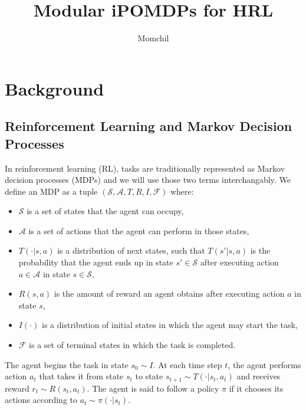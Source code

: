\documentclass[11pt]{article}
\title{Modular iPOMDPs for HRL}
\author{Momchil}
\begin{document}
\maketitle






\section{Background} 


\subsection{Reinforcement Learning and Markov Decision Processes}

In reinforcement learning (RL), tasks are traditionally represented as Markov decision processes (MDPs) \cite{Sutton1998} and we will use those two terms interchangably. We define an MDP as a tuple $(\mathcal{S}, \mathcal{A}, T, R, I, \mathcal{F})$ where:
\begin{itemize}
\item $\mathcal{S}$ is a set of states that the agent can occupy,
\item $\mathcal{A}$ is a set of actions that the agent can perform in those states,
\item $T(\cdot|s,a)$ is a distribution of next states, such that $T(s'|s,a)$ is the probability that the agent ends up in state $s' \in \mathcal{S}$ after executing action $a \in \mathcal{A}$ in state $s \in \mathcal{S}$,
\item $R(s,a)$ is the amount of reward an agent obtains after executing action $a$ in state $s$,
\item $I(\cdot)$ is a distribution of initial states in which the agent may start the task,
\item $\mathcal{F}$ is a set of terminal states in which the task is completed.
\end{itemize}

The agent begins the task in state $s_0 \sim I$. At each time step $t$, the agent performs action $a_t$ that takes it from state $s_t$ to state $s_{t+1} \sim T(\cdot|s_t,a_t)$ and receives reward $r_t \sim R(s_t, a_t)$. The agent is said to follow a policy $\pi$ if it chooses its actions according to $a_t \sim \pi(\cdot|s_t)$.
\end{document}
